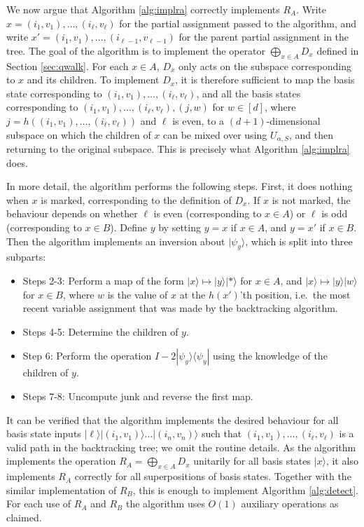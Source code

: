 \documentclass[11pt]{article}
\newcommand{\ket}[1]{| #1 \rangle}
\newcommand{\proj}[1]{| #1 \rangle \langle #1 |}
\begin{document}
We now argue that Algorithm \ref{alg:implra} correctly implements $R_A$. Write $x = (i_1,v_1),\dots,(i_\ell,v_\ell)$ for the partial assignment passed to the algorithm, and write $x' = (i_1,v_1),\dots,(i_{\ell-1},v_{\ell-1})$ for the parent partial assignment in the tree. The goal of the algorithm is to implement the operator $\bigoplus_{x \in A} D_x$ defined in Section \ref{sec:qwalk}. For each $x \in A$, $D_x$ only acts on the subspace corresponding to $x$ and its children. To implement $D_x$, it is therefore sufficient to map the basis state corresponding to $(i_1,v_1),\dots,(i_\ell,v_\ell)$, and all the basis states corresponding to $(i_1,v_1),\dots,(i_\ell,v_\ell),(j,w)$ for $w \in [d]$, where $j = h((i_1,v_1),\dots,(i_\ell,v_\ell))$ and $\ell$ is even, to a $(d+1)$-dimensional subspace on which the children of $x$ can be mixed over using $U_{\alpha,S}$, and then returning to the original subspace. This is precisely what Algorithm \ref{alg:implra} does.

In more detail, the algorithm performs the following steps. First, it does nothing when $x$ is marked, corresponding to the definition of $D_x$. If $x$ is not marked, the behaviour depends on whether $\ell$ is even (corresponding to $x \in A$) or $\ell$ is odd (corresponding to $x \in B$). Define $y$ by setting $y=x$ if $x\in A$, and $y=x'$ if $x \in B$. Then the algorithm implements an inversion about $\ket{\psi_y}$, which is split into three subparts:
%
\begin{itemize}
\item Steps 2-3: Perform a map of the form $\ket{x} \mapsto \ket{y}\ket{\ast}$ for $x \in A$, and $\ket{x} \mapsto \ket{y}\ket{w}$ for $x \in B$, where $w$ is the value of $x$ at the $h(x')$'th position, i.e.\ the most recent variable assignment that was made by the backtracking algorithm. %
\item Steps 4-5: Determine the children of $y$.
\item Step 6: Perform the operation $I - 2\proj{\psi_y}$ using the knowledge of the children of $y$.
\item Steps 7-8: Uncompute junk and reverse the first map.
\end{itemize}
%
It can be verified that the algorithm implements the desired behaviour for all basis state inputs $\ket{\ell}\ket{(i_1,v_1)}\dots \ket{(i_n,v_n)}$ such that $(i_1,v_1),\dots,(i_\ell,v_\ell)$ is a valid path in the backtracking tree; we omit the routine details. As the algorithm implements the operation $R_A = \bigoplus_{x \in A} D_x$ unitarily for all basis states $\ket{x}$, it also implements $R_A$ correctly for all superpositions of basis states. Together with the similar implementation of $R_B$, this is enough to implement Algorithm \ref{alg:detect}. For each use of $R_A$ and $R_B$ the algorithm uses $O(1)$ auxiliary operations as claimed.
\end{document}
